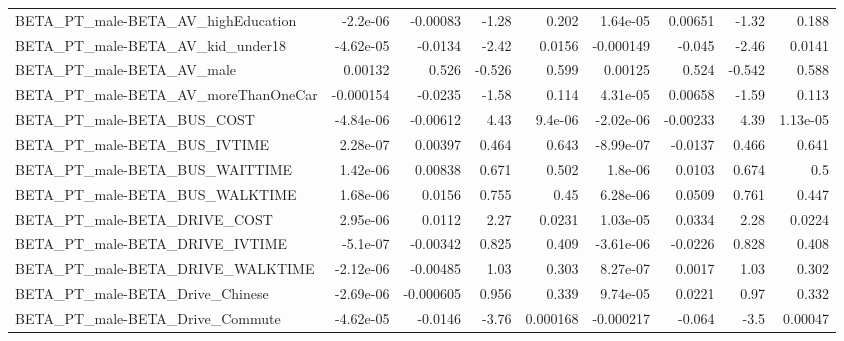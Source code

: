 \begin{tabular}{lrrrrrrrr}
BETA\_PT\_male-BETA\_AV\_highEducation                 &    -2.2e-06 &     -0.00083 &    -1.28 &    0.202 &   1.64e-05 &     0.00651 &        -1.32 &         0.188 \\
BETA\_PT\_male-BETA\_AV\_kid\_under18                   &   -4.62e-05 &      -0.0134 &    -2.42 &   0.0156 &  -0.000149 &      -0.045 &        -2.46 &        0.0141 \\
BETA\_PT\_male-BETA\_AV\_male                          &     0.00132 &        0.526 &   -0.526 &    0.599 &    0.00125 &       0.524 &       -0.542 &         0.588 \\
BETA\_PT\_male-BETA\_AV\_moreThanOneCar                &   -0.000154 &      -0.0235 &    -1.58 &    0.114 &   4.31e-05 &     0.00658 &        -1.59 &         0.113 \\
BETA\_PT\_male-BETA\_BUS\_COST                         &   -4.84e-06 &     -0.00612 &     4.43 &  9.4e-06 &  -2.02e-06 &    -0.00233 &         4.39 &      1.13e-05 \\
BETA\_PT\_male-BETA\_BUS\_IVTIME                       &    2.28e-07 &      0.00397 &    0.464 &    0.643 &  -8.99e-07 &     -0.0137 &        0.466 &         0.641 \\
BETA\_PT\_male-BETA\_BUS\_WAITTIME                     &    1.42e-06 &      0.00838 &    0.671 &    0.502 &    1.8e-06 &      0.0103 &        0.674 &           0.5 \\
BETA\_PT\_male-BETA\_BUS\_WALKTIME                     &    1.68e-06 &       0.0156 &    0.755 &     0.45 &   6.28e-06 &      0.0509 &        0.761 &         0.447 \\
BETA\_PT\_male-BETA\_DRIVE\_COST                       &    2.95e-06 &       0.0112 &     2.27 &   0.0231 &   1.03e-05 &      0.0334 &         2.28 &        0.0224 \\
BETA\_PT\_male-BETA\_DRIVE\_IVTIME                     &    -5.1e-07 &     -0.00342 &    0.825 &    0.409 &  -3.61e-06 &     -0.0226 &        0.828 &         0.408 \\
BETA\_PT\_male-BETA\_DRIVE\_WALKTIME                   &   -2.12e-06 &     -0.00485 &     1.03 &    0.303 &   8.27e-07 &      0.0017 &         1.03 &         0.302 \\
BETA\_PT\_male-BETA\_Drive\_Chinese                    &   -2.69e-06 &    -0.000605 &    0.956 &    0.339 &   9.74e-05 &      0.0221 &         0.97 &         0.332 \\
BETA\_PT\_male-BETA\_Drive\_Commute                    &   -4.62e-05 &      -0.0146 &    -3.76 & 0.000168 &  -0.000217 &      -0.064 &         -3.5 &       0.00047 \\

\end{tabular}
